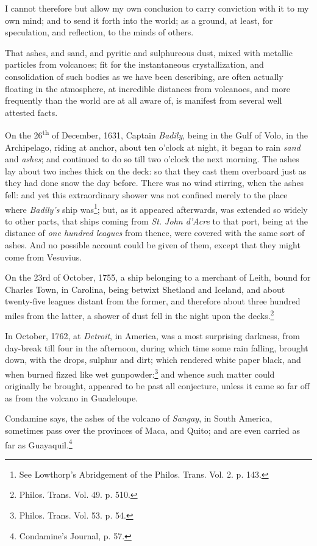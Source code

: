 \documentclass[a4paper, 12pt, oneside]{article}
\begin{document}
I cannot therefore but allow my own conclusion to carry conviction with it to my own mind; and to send it forth into the world; as a ground, at least, for speculation, and reflection, to the minds of others.

That ashes, and sand, and pyritic and sulphureous dust, mixed with metallic particles from volcanoes; fit for the instantaneous crystallization, and consolidation of such bodies as we have been describing, are often actually floating in the atmosphere, at incredible distances from volcanoes, and more frequently than the world are at all aware of, is manifest from several well attested facts.

On the 26\textsuperscript{th} of December, 1631, Captain \emph{Badily}, being in the Gulf of Volo, in the Archipelago, riding at anchor, about ten o'clock at night, it began to rain \emph{sand} and \emph{ashes}; and continued to do so till two o'clock the next morning. The ashes lay about two inches thick on the deck: so that they cast them overboard just as they had done snow the day before. There was no wind stirring, when the ashes fell: and yet this extraordinary shower was not confined merely to the place where \emph{Badily's} ship was\footnote{See Lowthorp's Abridgement of the Philos. Trans. Vol. 2. p. 143.}; but, as it appeared afterwards, was extended so widely to other parts, that ships coming from \emph{St. John d'Acre} to that port, being at the distance of \emph{one hundred leagues} from thence, were covered with the same sort of ashes. And no possible account could be given of them, except that they might come from Vesuvius.

On the 23rd of October, 1755, a ship belonging to a merchant of Leith, bound for Charles Town, in Carolina, being betwixt Shetland and Iceland, and about twenty-five leagues distant from the former, and therefore about three hundred miles from the latter, a shower of dust fell in the night upon the decks.\footnote{Philos. Trans. Vol. 49. p. 510.}

In October, 1762, at \emph{Detroit}, in America, was a most surprising darkness, from day-break till four in the afternoon, during which time some rain falling, brought down, with the drops, sulphur and dirt; which rendered white paper black, and when burned fizzed like wet gunpowder:\footnote{Philos. Trans. Vol. 53. p. 54.} and whence such matter could originally be brought, appeared to be past all conjecture, unless it came so far off as from the volcano in Guadeloupe.

Condamine says, the ashes of the volcano of \emph{Sangay}, in South America, sometimes pass over the provinces of Maca, and Quito; and are even carried as far as Guayaquil.\footnote{Condamine's Journal, p. 57.}
\end{document}
